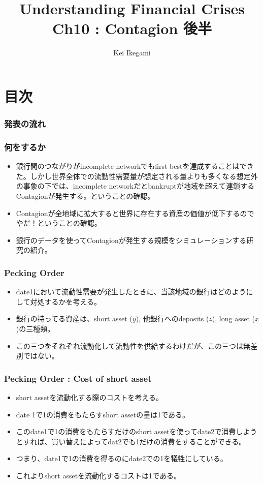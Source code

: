 \documentclass[dvipdfmx, 12pt]{beamer}
\title{Understanding Financial Crises\\Ch10 : Contagion 後半}
\author{Kei Ikegami}
\begin{document}
\newcommand{\argmin}{\mathop{\rm arg~min}\limits}

\frame{\maketitle}

\section*{目次}
\begin{frame} \frametitle{発表の流れ}
\tableofcontents
\end{frame}

\begin{frame}\frametitle{何をするか}
	\begin{itemize}
	\item 銀行間のつながりがincomplete networkでもfirst bestを達成することはできた。しかし世界全体での流動性需要量が想定される量よりも多くなる想定外の事象の下では、incomplete networkだとbankruptが地域を超えて連鎖するContagionが発生する。ということの確認。
	\item Contagionが全地域に拡大すると世界に存在する資産の価値が低下するのでやだ！ということの確認。
	\item 銀行のデータを使ってContagionが発生する規模をシミュレーションする研究の紹介。
	\end{itemize}
\end{frame}

\begin{frame}\frametitle{Pecking Order}
	\begin{itemize}
	\item date1において流動性需要が発生したときに、当該地域の銀行はどのようにして対処するかを考える。
	\item 銀行の持ってる資産は、short asset ($y$), 他銀行へのdeposits ($z$), long asset ($x$)の三種類。
	\item この三つをそれぞれ流動化して流動性を供給するわけだが、この三つは無差別ではない。
	\end{itemize}
\end{frame}

\begin{frame}\frametitle{Pecking Order : Cost of short asset}
	\begin{itemize}
	\item short assetを流動化する際のコストを考える。
	\item date 1で1の消費をもたらすshort assetの量は1である。
	\item このdate1で1の消費をもたらすだけのshort assetを使ってdate2で消費しようとすれば、買い替えによってdat2でも1だけの消費をすることができる。
	\item つまり、date1で1の消費を得るのにdate2での1を犠牲にしている。
	\item これよりshort assetを流動化するコストは1である。
	\end{itemize}
\end{frame}
\end{document}
